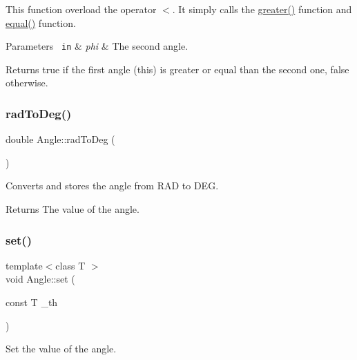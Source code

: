 This function overload the operator $<$. It simply calls the {\ttfamily \mbox{\hyperlink{class_angle_a2ead65678819acef29cc4c7f2400f631}{greater()}}} function and {\ttfamily \mbox{\hyperlink{class_angle_a21d2e7c68957afdd5c7edf3efd3e0bdc}{equal()}}} function. 
\begin{DoxyParams}[1]{Parameters}
\mbox{\texttt{ in}}  & {\em phi} & The second angle. \\
\hline
\end{DoxyParams}
\begin{DoxyReturn}{Returns}
{\ttfamily true} if the first angle (this) is greater or equal than the second one, {\ttfamily false} otherwise. 
\end{DoxyReturn}
\mbox{\label{class_angle_a8d7691e304041c8deafdec82497a781f}} 
\subsubsection{\texorpdfstring{radToDeg()}{radToDeg()}}
{\footnotesize\ttfamily double Angle\+::rad\+To\+Deg (\begin{DoxyParamCaption}{ }\end{DoxyParamCaption})\hspace{0.3cm}{\ttfamily [inline]}}



Converts and stores the angle from R\+AD to D\+EG. 

\begin{DoxyReturn}{Returns}
The value of the angle. 
\end{DoxyReturn}
\mbox{\label{class_angle_a41d5a0188663cb0178b0e9e0628ea00c}} 
\subsubsection{\texorpdfstring{set()}{set()}}
{\footnotesize\ttfamily template$<$class T $>$ \\
void Angle\+::set (\begin{DoxyParamCaption}\item[{const T}]{\+\_\+th }\end{DoxyParamCaption})\hspace{0.3cm}{\ttfamily [inline]}}



Set the value of the angle. 


